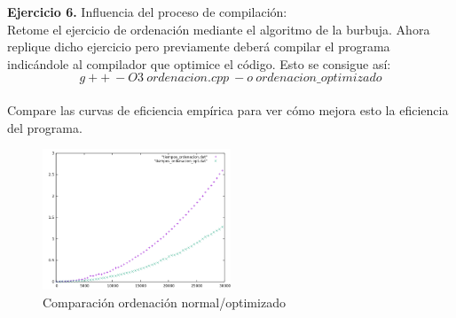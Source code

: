 \documentclass[titlepage, 12pt,a4paper]{article}
\begin{document}
\newpage

\textbf{\large Ejercicio 6.} Influencia del proceso de compilación:\\

Retome el ejercicio de ordenación mediante el algoritmo de la burbuja. Ahora replique
dicho ejercicio pero previamente deberá compilar el programa indicándole al compilador
que optimice el código. Esto se consigue así:
$$g++\ -O3\ ordenacion.cpp\ -o\ ordenacion\_optimizado$$
\\
Compare las curvas de eficiencia empírica para ver cómo mejora esto la eficiencia del
programa.
\\


\begin{figure}[!ht]
  \caption{Comparación ordenación normal/optimizado}
  \centering
    \includegraphics[width=0.5\textwidth]{./img/ef_pract_ej_6.png}
\end{figure}
 
\vspace {1em}  	
\end{document}
